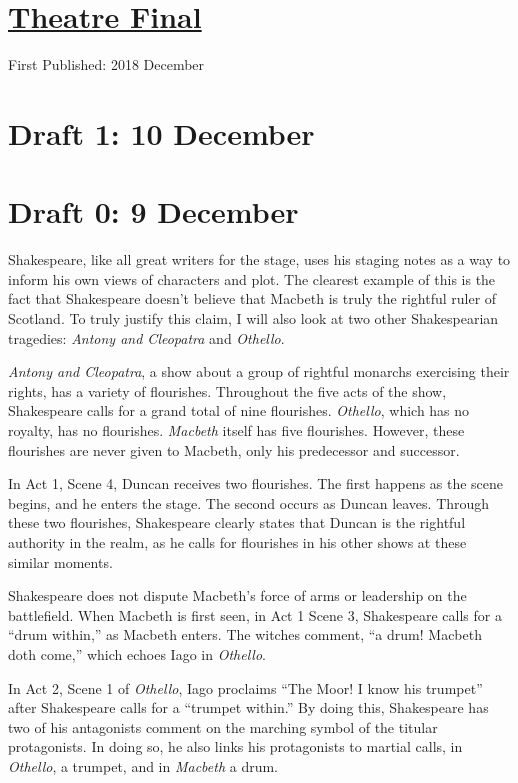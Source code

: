 \documentclass[12pt]{article}[titlepage]
\newcommand{\say}[1]{``#1''}
\newcommand{\1}{\={a}}
\newcommand{\2}{\={e}}
\newcommand{\3}{\={\i}}
\newcommand{\4}{\=o}
\newcommand{\5}{\=u}
\newcommand{\6}{\={A}}
\renewcommand{\,}{\textsuperscript{,}}
\begin{document}
\doublespacing
\section{\href{theatre-final.html}{Theatre Final}}
First Published: 2018 December 
\section{Draft 1: 10 December}

\section{Draft 0: 9 December}
Shakespeare, like all great writers for the stage, uses his staging notes as a way to inform his own views of characters and plot.
The clearest example of this is the fact that Shakespeare doesn't believe that Macbeth is truly the rightful ruler of Scotland.
To truly justify this claim, I will also look at two other Shakespearian tragedies: \textit{Antony and Cleopatra} and \textit{Othello}.

\textit{Antony and Cleopatra}, a show about a group of rightful monarchs exercising their rights, has a variety of flourishes.
Throughout the five acts of the show, Shakespeare calls for a grand total of nine flourishes.
\textit{Othello}, which has no royalty, has no flourishes.
\textit{Macbeth} itself has five flourishes.
However, these flourishes are never given to Macbeth, only his predecessor and successor.

In Act 1, Scene 4, Duncan receives two flourishes.
The first happens as the scene begins, and he enters the stage.
The second occurs as Duncan leaves.
Through these two flourishes, Shakespeare clearly states that Duncan is the rightful authority in the realm, as he calls for flourishes in his other shows at these similar moments.

Shakespeare does not dispute Macbeth's force of arms or leadership on the battlefield.
When Macbeth is first seen, in Act 1 Scene 3, Shakespeare calls for a \say{drum within,} as Macbeth enters.
The witches comment, \say{a drum! Macbeth doth come,} which echoes Iago in \textit{Othello}.

In Act 2, Scene 1 of \textit{Othello}, Iago proclaims \say{The Moor! I know his trumpet} after Shakespeare calls for a \say{trumpet within.}
By doing this, Shakespeare has two of his antagonists comment on the marching symbol of the titular protagonists.
In doing so, he also links his protagonists to martial calls, in \textit{Othello}, a trumpet, and in \textit{Macbeth} a drum.
\end{document}
